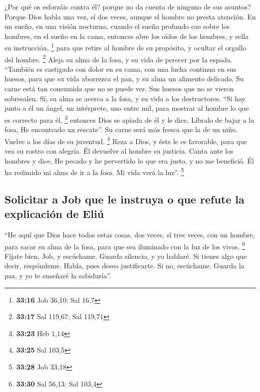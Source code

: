  ¿Por qué os esforzáis contra él? porque no da cuenta de
ninguno de sus asuntos?  Porque Dios habla una vez, sí
dos veces, aunque el hombre no presta atención.  En un
sueño, en una visión nocturna, cuando el sueño profundo cae sobre los
hombres, en el sueño en la cama,  entonces abre los oídos
de los hombres, y sella su instrucción, \footnote{\textbf{33:16} Job
  36,10; Sal 16,7}  para que retire al hombre de su
propósito, y ocultar el orgullo del hombre. \footnote{\textbf{33:17} Sal
  119,67; Sal 119,71}  Aleja su alma de la fosa, y su
vida de perecer por la espada.  ``También es castigado
con dolor en su cama, con una lucha continua en sus huesos,
 para que su vida aborrezca el pan, y su alma un alimento
delicado.  Su carne está tan consumida que no se puede
ver. Sus huesos que no se vieron sobresalen.  Sí, su alma
se acerca a la fosa, y su vida a los destructores.  ``Si
hay junto a él un ángel, un intérprete, uno entre mil, para mostrar al
hombre lo que es correcto para él, \footnote{\textbf{33:23} Heb 1,14}
 entonces Dios se apiada de él y le dice, Líbralo de
bajar a la fosa, He encontrado un rescate''.  Su carne
será más fresca que la de un niño. Vuelve a los días de su juventud.
\footnote{\textbf{33:25} Sal 103,5}  Reza a Dios, y éste
le es favorable, para que vea su rostro con alegría. Él devuelve al
hombre su justicia.  Canta ante los hombres y dice, He
pecado y he pervertido lo que era justo, y no me benefició.
 Él ha redimido mi alma de ir a la fosa. Mi vida verá la
luz''. \footnote{\textbf{33:28} Job 33,18}

\hypertarget{solicitar-a-job-que-le-instruya-o-que-refute-la-explicaciuxf3n-de-eliuxfa}{%
\subsection{Solicitar a Job que le instruya o que refute la explicación
de
Eliú}\label{solicitar-a-job-que-le-instruya-o-que-refute-la-explicaciuxf3n-de-eliuxfa}}

 ``He aquí que Dios hace todas estas cosas, dos veces, sí
tres veces, con un hombre,  para sacar su alma de la
fosa, para que sea iluminado con la luz de los vivos. \footnote{\textbf{33:30}
  Sal 56,13; Sal 103,4}  Fíjate bien, Job, y escúchame.
Guarda silencio, y yo hablaré.  Si tienes algo que decir,
respóndeme. Habla, pues deseo justificarte.  Si no,
escúchame. Guarda la paz, y yo te enseñaré la sabiduría''.


